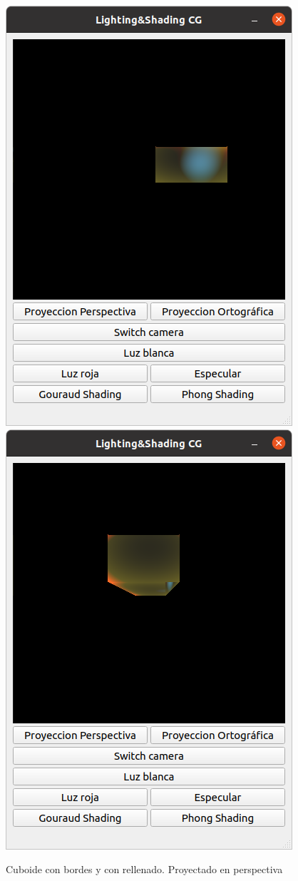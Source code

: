 \documentclass[12pt]{article}
\begin{document}
\begin{figure}[H]
\centering
\includegraphics[scale=0.5]{images/ej3.png}
\includegraphics[scale=0.5]{images/ej4.png}
\caption{Cuboide con bordes y con rellenado. Proyectado en perspectiva}
\end{figure}
\end{document}
